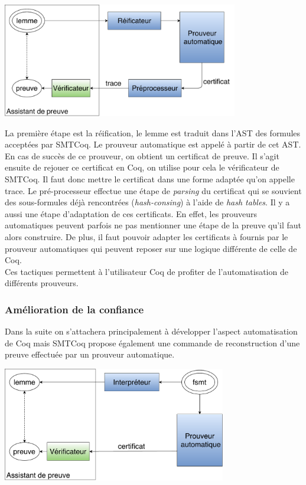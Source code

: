 \documentclass[11pt]{article}
\begin{document}
\begin{center}
    \includegraphics[height=5cm]{Automatisation.pdf}
\end{center}

La première étape est la réification, le lemme est traduit dans l'AST des formules acceptées par SMTCoq. Le prouveur automatique est appelé à partir de cet AST. En cas de succès de ce prouveur, on obtient un certificat de preuve. 
Il s'agit ensuite de rejouer ce certificat en Coq, on utilise pour cela le vérificateur de SMTCoq. Il faut donc mettre le certificat dans une forme adaptée qu'on appelle trace. Le pré-processeur effectue une étape de \textit{parsing} du certificat qui se souvient des sous-formules déjà rencontrées (\textit{hash-consing}) à l'aide de \textit{hash tables}.  Il y a aussi une étape d'adaptation de ces certificats. En effet, les prouveurs automatiques peuvent parfois ne pas mentionner une étape de la preuve qu'il faut alors construire. De plus, il faut pouvoir adapter les certificats à fournis par le prouveur automatiques qui peuvent reposer sur une logique différente de celle de Coq. \\

Ces tactiques permettent à l'utilisateur Coq de profiter de l'automatisation de différents prouveurs.\\



\subsubsection{Amélioration de la confiance}

Dans la suite on s'attachera principalement à développer l'aspect automatisation de Coq mais SMTCoq propose également une commande de reconstruction d'une preuve effectuée par un prouveur automatique.

\begin{center}
\includegraphics[height=5cm]{Confiance.pdf}
\end{center}
\end{document}
